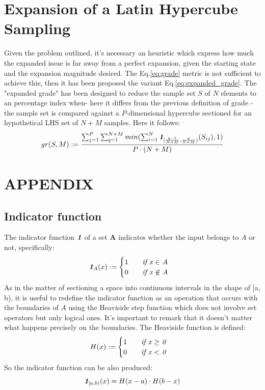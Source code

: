 \documentclass{article}
\newcommand{\meqref}[1]{Eq.\ref{#1}}
\newcommand{\indfunc}[1]{\textit{\textbf{1}}_{#1}}
\begin{document}
\section{Expansion of a Latin Hypercube Sampling}
\label{sec:lhs_expansion}

Given the problem outlined, it's necessary an heuristic which express how much the expanded issue is far away from a perfect expansion, given the starting state and the expansion magnitude desired. The \meqref{eq:grade} metric is not sufficient to achieve this, then it has been proposed the variant \meqref{eq:expanded_grade}. 
The "expanded grade" has been designed to reduce the sample set $S$ of $N$ elements to an percentage index when- here it differs from the previous definition of grade - the sample set is compared against a $P$-dimensional hypercube sectioned for an hypothetical LHS set of $N + M$ samples. Here it follows:
\begin{equation}
\label{eq:expanded_grade}
gr(S, M) := \frac{\sum^P_{j=1}\sum^{N + M}_{q=1} min(\sum^N_{i=1}\indfunc{[\frac{q-1}{N + M}, \frac{q}{N + M})}(S_{ij}), 1)}{P \cdot (N + M)}
\end{equation}


\section{APPENDIX}
\subsection{Indicator function}
\label{appendix:indicator_function}
The indicator function $\indfunc{}$ of a set \textbf{A} indicates whether the input belongs  to $A$ or not, specifically:
\begin{equation}
\label{eq:indicator_function}
\indfunc{A}(x) := 
\begin{cases}
1 \qquad \text{\textit{if x $\in$ A}}\\
0 \qquad \text{\textit{if x $\not\in$ A}}
 \end{cases}
\end{equation}
As in the matter of sectioning a space into continuous intervals in the shape of [a, b), it is useful to redefine the indicator function as an operation that occurs with the boundaries of $A$ using the Heaviside step function which does not involve set operators but only logical ones. It's important to remark that it doesn't matter what happens precisely on the boundaries. 
The Heaviside function is defined:
\begin{equation}
\label{eq:heaviside}
H(x) := 
\begin{cases}
1 \qquad \text{\textit{if x $\geq$ 0}}\\
0 \qquad \text{\textit{if x $<$ 0}}
\end{cases}
\end{equation}
So the indicator function can be also produced:
\begin{equation}
\label{eq:indicator_function_with_h}
\indfunc{[a,b)}(x) = H(x - a) \cdot H(b - x)
\end{equation}
\end{document}
